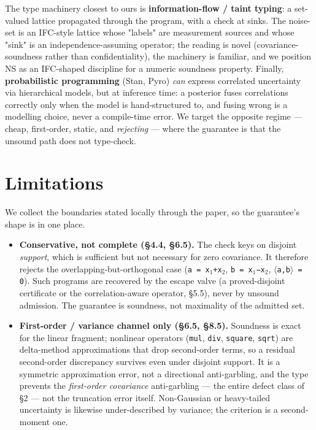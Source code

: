 \documentclass[sigplan,review,anonymous,10pt]{acmart}
\begin{document}
The type machinery closest to ours is \textbf{information-flow / taint typing}: a set-valued lattice propagated through the program, with a check at sinks. The noise-set is an IFC-style lattice whose "labels" are measurement sources and whose "sink" is an independence-assuming operator; the reading is novel (covariance-soundness rather than confidentiality), the machinery is familiar, and we position NS as an IFC-shaped discipline for a numeric soundness property. Finally, \textbf{probabilistic programming} (Stan, Pyro) \emph{can} express correlated uncertainty via hierarchical models, but at inference time: a posterior fuses correlations correctly only when the model is hand-structured to, and fusing wrong is a modelling choice, never a compile-time error. We target the opposite regime --- cheap, first-order, static, and \emph{rejecting} --- where the guarantee is that the unsound path does not type-check.

\section{Limitations}

We collect the boundaries stated locally through the paper, so the guarantee's shape is in one place.

\begin{itemize}
  \item \textbf{Conservative, not complete (§4.4, §6.5).} The check keys on disjoint \emph{support}, which is sufficient but not necessary for zero covariance. It therefore rejects the overlapping-but-orthogonal case (\texttt{a = x$_{1}$+x$_{2}$}, \texttt{b = x$_{1}$−x$_{2}$}, \texttt{$\langle$a,b$\rangle$ = 0}). Such programs are recovered by the escape valve (a proved-disjoint certificate or the correlation-aware operator, §5.5), never by unsound admission. The guarantee is soundness, not maximality of the admitted set.
\end{itemize}

\begin{itemize}
  \item \textbf{First-order / variance channel only (§6.5, §8.5).} Soundness is exact for the linear fragment; nonlinear operators (\texttt{mul}, \texttt{div}, \texttt{square}, \texttt{sqrt}) are delta-method approximations that drop second-order terms, so a residual second-order discrepancy survives even under disjoint support. It is a symmetric approximation error, not a directional anti-garbling, and the type prevents the \emph{first-order covariance} anti-garbling --- the entire defect class of §2 --- not the truncation error itself. Non-Gaussian or heavy-tailed uncertainty is likewise under-described by variance; the criterion is a second-moment one.
\end{itemize}
\end{document}
